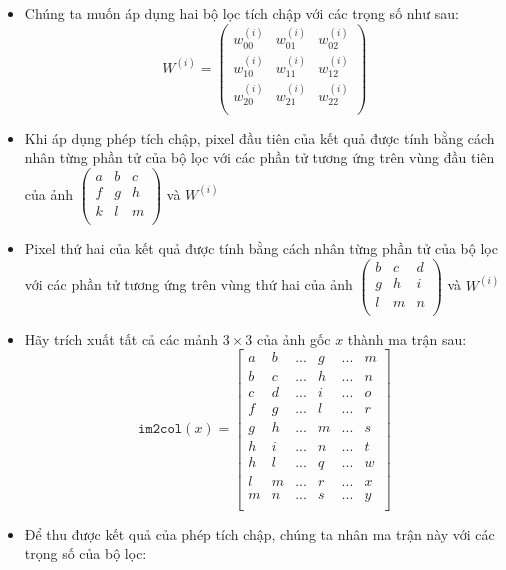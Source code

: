 \documentclass{book}
\begin{document}
\begin{itemize}
    \item Chúng ta muốn áp dụng hai bộ lọc tích chập với các trọng số như sau:
    \[
    W^{(i)} =
    \begin{pmatrix}
    w^{(i)}_{00} & w^{(i)}_{01} & w^{(i)}_{02} \\
    w^{(i)}_{10} & w^{(i)}_{11} & w^{(i)}_{12} \\
    w^{(i)}_{20} & w^{(i)}_{21} & w^{(i)}_{22} \\
    \end{pmatrix}
    \]
    \item Khi áp dụng phép tích chập, pixel đầu tiên của kết quả được tính bằng cách nhân từng phần tử của bộ lọc với các phần tử tương ứng trên vùng đầu tiên của ảnh 
    $ 
    \begin{pmatrix}
    a & b & c \\
    f & g & h \\
    k & l & m \\
    \end{pmatrix}
    $ 
    và $W^{(i)}$
    \item Pixel thứ hai của kết quả được tính bằng cách nhân từng phần tử của bộ lọc với các phần tử tương ứng trên vùng thứ hai của ảnh 
    $ 
    \begin{pmatrix}
    b & c & d \\
    g & h & i \\
    l & m & n \\
    \end{pmatrix}
    $ 
    và $W^{(i)}$
    \item Hãy trích xuất tất cả các mảnh $3 \times 3$ của ảnh gốc $x$ thành ma trận sau:
    \[
    \texttt{im2col}(x) = 
    \begin{bmatrix}
    a & b & ... & g & ... & m \\
    b & c & ... & h & ... & n \\
    c & d & ... & i & ... & o \\
    f & g & ... & l & ... & r \\
    g & h & ... & m & ... & s \\
    h & i & ... & n & ... & t \\
    h & l & ... & q & ... & w \\
    l & m & ... & r & ... & x \\
    m & n & ... & s & ... & y \\
    \end{bmatrix}
    \]
    \item Để thu được kết quả của phép tích chập, chúng ta nhân ma trận này với các trọng số của bộ lọc:

\end{itemize}
\end{document}
